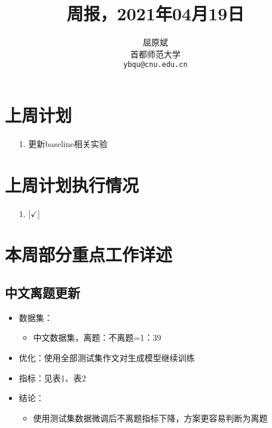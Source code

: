 \documentclass[11pt]{article}
\title{周报，2021年04月19日}
\author{屈原斌 \\
  首都师范大学 \\
    {\tt ybqu@cnu.edu.cn}}
\date{}
\begin{document}
\begin{CJK}{UTF8}{gkai}

\maketitle
\CJKindent

\section{上周计划}


\begin{itemize}
  \item [1.] 更新baseline相关实验
\end{itemize}


\section{上周计划执行情况}
\begin{itemize}
\item [1.] [$\checkmark$] 
\end{itemize}

\section{本周部分重点工作详述}

\subsection{中文离题更新}

\begin{itemize}
  \item 数据集：
  \begin{itemize}
    \item 中文数据集，离题：不离题=1：39
  \end{itemize}
  \item 优化：使用全部测试集作文对生成模型继续训练
  \item 指标：见表1、表2
  \item 结论：
  \begin{itemize}
    \item 使用测试集数据微调后不离题指标下降，方案更容易判断为离题
  \end{itemize}
\end{itemize}


\end{CJK}
\end{document}
